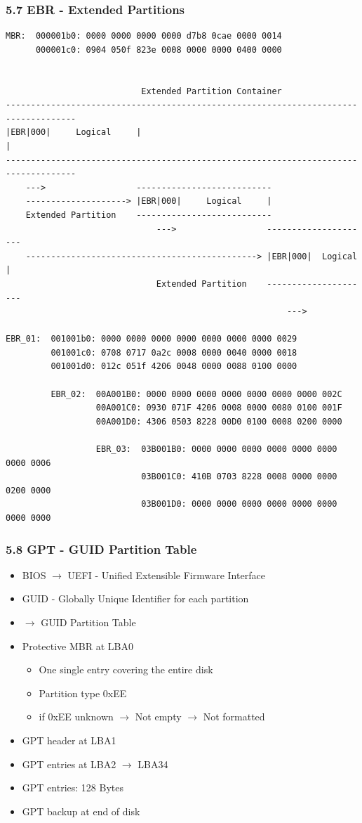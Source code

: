 \begin{frame}[fragile]
  \frametitle{5.7 EBR - Extended Partitions}
  \begin{lstlisting}[basicstyle=\tiny]
MBR:  000001b0: 0000 0000 0000 0000 d7b8 0cae 0000 0014
      000001c0: 0904 050f 823e 0008 0000 0000 0400 0000


                           Extended Partition Container                          
------------------------------------------------------------------------------------
|EBR|000|     Logical     |                                                        |
------------------------------------------------------------------------------------
    --->                  ---------------------------
    --------------------> |EBR|000|     Logical     |
    Extended Partition    ---------------------------
                              --->                  ---------------------
    ----------------------------------------------> |EBR|000|  Logical  |
                              Extended Partition    ---------------------
                                                        --->

EBR_01:  001001b0: 0000 0000 0000 0000 0000 0000 0000 0029
         001001c0: 0708 0717 0a2c 0008 0000 0040 0000 0018
         001001d0: 012c 051f 4206 0048 0000 0088 0100 0000

         EBR_02:  00A001B0: 0000 0000 0000 0000 0000 0000 0000 002C
                  00A001C0: 0930 071F 4206 0008 0000 0080 0100 001F
                  00A001D0: 4306 0503 8228 00D0 0100 0008 0200 0000

                  EBR_03:  03B001B0: 0000 0000 0000 0000 0000 0000 0000 0006
                           03B001C0: 410B 0703 8228 0008 0000 0000 0200 0000
                           03B001D0: 0000 0000 0000 0000 0000 0000 0000 0000
  \end{lstlisting}
\end{frame}


\begin{frame}[fragile]
  \frametitle{5.8 GPT - GUID Partition Table}
    \begin{itemize}
        \item BIOS $\to$ UEFI - Unified Extensible Firmware Interface
	\item GUID - Globally Unique Identifier for each partition
	\item[] $\to$ GUID Partition Table
	\item Protective MBR at LBA0
        \begin{itemize}
            \item One single entry covering the entire disk
            \item Partition type 0xEE
	    \item[] if 0xEE unknown $\to$ Not empty $\to$ Not formatted
        \end{itemize}
	\item GPT header at LBA1
	\item GPT entries at LBA2 $\to$ LBA34
	\item GPT entries: 128 Bytes
	\item GPT backup at end of disk
    \end{itemize}
\end{frame}


